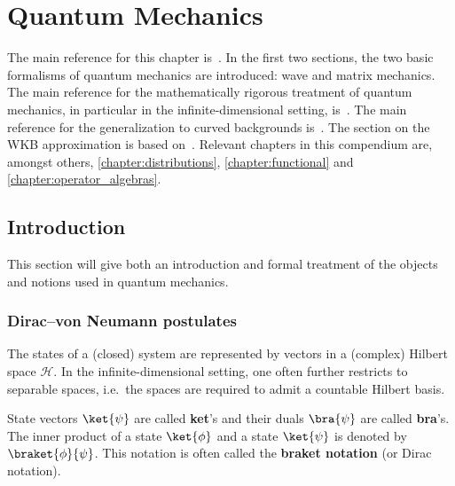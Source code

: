 \chapter{Quantum Mechanics}\label{chapter:qm}

    The main reference for this chapter is~\citet{bransden_quantum_2000}. In the first two sections, the two basic formalisms of quantum mechanics are introduced: wave and matrix mechanics. The main reference for the mathematically rigorous treatment of quantum mechanics, in particular in the infinite-dimensional setting, is~\citet{moretti_mathematical_2016}. The main reference for the generalization to curved backgrounds is~\citet{schuller_lectures_2016}. The section on the WKB approximation is based on~\citet{bates_lectures_1997}. Relevant chapters in this compendium are, amongst others, \ref{chapter:distributions}, \ref{chapter:functional} and \ref{chapter:operator_algebras}.

    \minitoc

\section{Introduction}

    This section will give both an introduction and formal treatment of the objects and notions used in quantum mechanics.

\subsection{Dirac--von Neumann postulates}\label{section:qm_postulates}

    \begin{axiom}[States]
        The states of a (closed) system are represented by vectors in a (complex) Hilbert space $\mathcal{H}$. In the infinite-dimensional setting, one often further restricts to separable spaces, i.e.~the spaces are required to admit a countable Hilbert basis.
    \end{axiom}

    \begin{notation}
        State vectors $\ket{\psi}$ are called \textbf{ket}'s and their duals $\bra{\psi}$ are called \textbf{bra}'s. The inner product of a state $\ket{\phi}$ and a state $\ket{\psi}$ is denoted by $\braket{\phi}{\psi}$. This notation is often called the \textbf{braket notation} (or Dirac notation).
    \end{notation}

